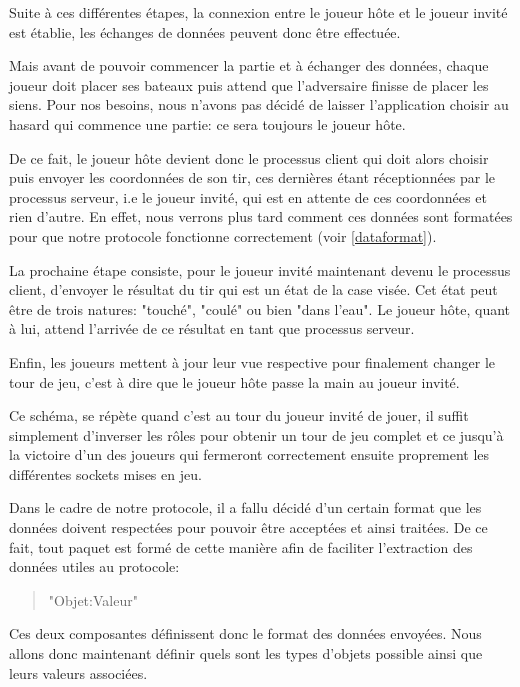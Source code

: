 			Suite à ces différentes étapes, la connexion entre le joueur hôte et le joueur invité est établie, les échanges de données peuvent donc être effectuée.

			Mais avant de pouvoir commencer la partie et à échanger des données, chaque joueur doit placer ses bateaux puis attend que l'adversaire finisse de placer les siens. Pour nos besoins, nous n'avons pas décidé de laisser l'application choisir au hasard qui commence une partie: ce sera toujours le joueur hôte. \newline
			
			De ce fait, le joueur hôte devient donc le processus client qui doit alors choisir puis envoyer les coordonnées de son tir, ces dernières étant réceptionnées par le processus serveur, i.e le joueur invité, qui est en attente de ces coordonnées et rien d'autre. En effet, nous verrons plus tard comment ces données sont formatées pour que notre protocole fonctionne correctement (voir \ref{dataformat}).  \newline
			
			La prochaine étape consiste, pour le joueur invité maintenant devenu le processus client, d'envoyer le résultat du tir qui est un état de la case visée. Cet état peut être de trois natures: "touché", "coulé" ou bien "dans l'eau". Le joueur hôte, quant à lui, attend l'arrivée de ce résultat en tant que processus serveur.\newline \label{states}
			
			Enfin, les joueurs mettent à jour leur vue respective pour finalement changer le tour de jeu, c'est à dire que le joueur hôte passe la main au joueur invité. \newline
			
			Ce schéma, se répète quand c'est au tour du joueur invité de jouer, il suffit simplement d'inverser les rôles pour obtenir un tour de jeu complet et ce jusqu'à la victoire d'un des joueurs qui fermeront correctement ensuite proprement les différentes sockets mises en jeu.
			
		\label{dataformat}
			Dans le cadre de notre protocole, il a fallu décidé d'un certain format que les données doivent respectées pour pouvoir être acceptées et ainsi traitées. De ce fait, tout paquet est formé de cette manière afin de faciliter l'extraction des données utiles au protocole:
			\begin{quote}
				"Objet:Valeur"
			\end{quote}
			Ces deux composantes définissent donc le format des données envoyées. Nous allons donc maintenant définir quels sont les types d'objets possible ainsi que leurs valeurs associées.
			
